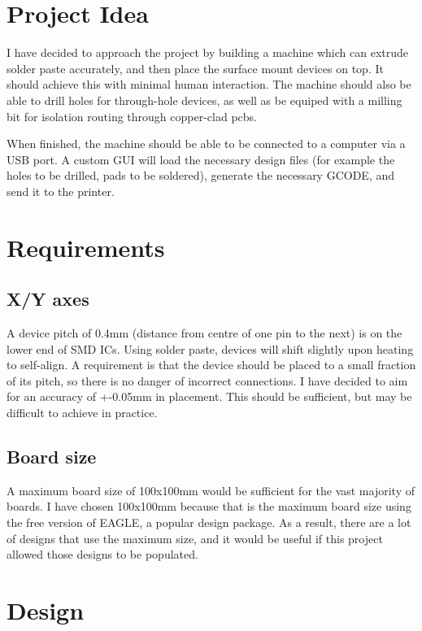 \documentclass[a4paper,11pt]{article}  %
\begin{document}
\section{Project Idea}
I have decided to approach the project by building a machine which can extrude solder paste accurately, and then place
the surface mount devices on top. It should achieve this with minimal human interaction. The machine should also be able to
drill holes for through-hole devices, as well as be equiped with a milling bit for isolation routing through copper-clad pcbs.

\parskip 0.18in

When finished, the machine should be able to be connected to a computer via a USB port. A custom GUI will load the necessary 
design files (for example the holes to be drilled, pads to be soldered), generate the necessary GCODE, and send it to the printer.

\section{Requirements}

\subsection{X/Y axes}
A device pitch of 0.4mm (distance from centre of one pin to the next) is on the lower end of SMD ICs. Using solder paste,
devices will shift slightly upon heating to self-align. A requirement is that the device should be placed to a
small fraction of its pitch, so there is no danger of incorrect connections. I have decided to aim for an accuracy of +-0.05mm
in placement. This should be sufficient, but may be difficult to achieve in practice.

\subsection{Board size}
A maximum board size of 100x100mm would be sufficient for the vast majority of boards. I have chosen 100x100mm because that
is the maximum board size using the free version of EAGLE, a popular design package. As a result, there are a lot of designs
that use the maximum size, and it would be useful if this project allowed those designs to be populated.

\section{Design}
\end{document}
